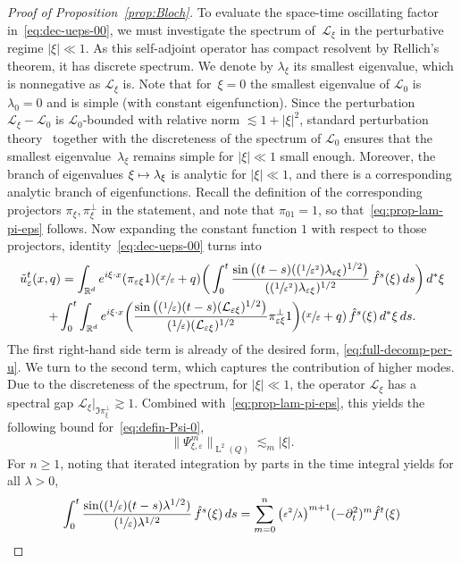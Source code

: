 \documentclass[JEP,XML,SOM,Unicode,published]{cedram}
\newcommand{\Psfrac}[2]{(\sfrac{#1}{#2})}
\newcommand\mto{\mathchoice{\longmapsto}{\mapsto}{\mapsto}{\mapsto}}
\theoremstyle{plain}
\theoremstyle{definition}
\numberwithin{equation}{section}
\newcommand{\e}{\varepsilon}
\newcommand{\Lc}{\mathcal{L}}
\newcommand{\R}{\mathbb R}
\newcommand{\Ld}{\operatorname{L}}
\begin{document}
\begin{proof}[Proof of Proposition~\ref{prop:Bloch}]
To evaluate the space-time oscillating factor in~\eqref{eq:dec-ueps-00}, we must investigate the spectrum of~$\Lc_\xi$ in the perturbative regime $|\xi|\ll1$. As this self-adjoint operator has compact resolvent by Rellich's theorem, it has discrete spectrum.
We denote by $\lambda_\xi$ its smallest eigenvalue, which is nonnegative as $\Lc_\xi$ is.
Note that for~\mbox{$\xi=0$} the smallest eigenvalue of $\Lc_0$ is $\lambda_0=0$ and is simple (with constant eigenfunction).
Since the perturbation $\Lc_\xi-\Lc_0$ is $\Lc_0$-bounded with relative norm $\lesssim1+|\xi|^2$, standard perturbation theory~\cite{Kato} together with the discreteness of the spectrum of $\Lc_0$ ensures that the smallest eigenvalue~$\lambda_\xi$ remains simple for $|\xi|\ll1$ small enough. Moreover, the branch of eigenvalues $\xi\mto \lambda_\xi$ is analytic for $|\xi|\ll1$, and there is a corresponding analytic branch of eigenfunctions.
Recall the definition of the corresponding projectors $\pi_\xi,\pi_\xi^\bot$ in the statement, and note that $\pi_01=1$, {so that}~\eqref{eq:prop-lam-pi-eps} follows.
Now expanding the constant function $1$ with respect to those projectors, identity~\eqref{eq:dec-ueps-00} turns into
\begin{multline}\label{eq:dec-ueps-0}
\tilde u_\e^t(x,q)=\int_{\R^d}e^{i\xi\cdot x}(\pi_{\e\xi}1)(\sfrac x\e+q)\bigg(\int_0^t \frac{\sin\big((t-s)(\Psfrac1{\e^2}\lambda_{\e \xi})^{1/2}\big)}{(\Psfrac1{\e^2}\lambda_{\e \xi})^{1/2}}\,\hat f^s(\xi)\,ds\bigg)\,d^*\xi\\
+\int_0^t\int_{\R^d}e^{i\xi\cdot x} \bigg(\frac{\sin\big(\Psfrac1\e(t-s)(\Lc_{\e \xi})^{1/2}\big)}{\Psfrac1\e(\Lc_{\e \xi})^{1/2}}\pi_{\e\xi}^\bot1\bigg)(\sfrac x\e+q)\,\hat f^s(\xi)\,d^*\xi\,ds.
\end{multline}
The first right-hand side term is already of the desired form, \cf \eqref{eq:full-decomp-per-u}.
We turn to the second term, which captures the contribution of higher modes.
Due to the discreteness of the spectrum, for $|\xi|\ll1$, the operator $\Lc_\xi$ has a spectral gap $\Lc_\xi|_{\Im\pi_{\xi}^\bot}\gtrsim1$. Combined with~\eqref{eq:prop-lam-pi-eps}, this yields the following bound for~\eqref{eq:defin-Psi-0},
\[\|\Psi_{\xi,\e}^m\|_{\Ld^2( Q)}\lesssim_m|\xi|.\]
For $n\ge1$, noting that iterated integration by parts in the time integral yields for all $\lambda>0$,
\begin{multline*}
\int_0^t\frac{\sin(\Psfrac1\e(t-s)\lambda^{1/2})}{\Psfrac1\e \lambda^{1/2}}\,\hat f^s(\xi)\,ds=\sum_{m=0}^{n} \big(\sfrac{\e^2}{\lambda}\big)^{m+1}(-\partial_t^2)^m\hat f^t(\xi)\\

\end{multline*}
\end{proof}
\end{document}
